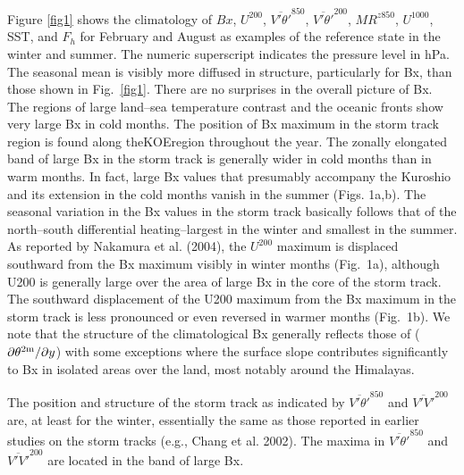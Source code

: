 \documentclass{ametsocV5}
\begin{document}
Figure \ref{fig1} shows the climatology of $Bx$, $U^{200}$,
$\overline{V'\theta'}^{850}$, $\overline{V'\theta'}^{200}$, 
$MR^{z850}$, $U^{1000}$, SST, and $F_h$ for February and
August as examples of the reference state in the winter
and summer. The numeric superscript indicates the pressure
level in hPa. The seasonal mean is visibly more
diffused in structure, particularly for Bx, than those
shown in Fig.~\ref{fig1}. There are no surprises in the overall
picture of Bx. The regions of large land--sea temperature
contrast and the oceanic fronts show very large Bx in cold
months. The position of Bx maximum in the storm track
region is found along theKOEregion throughout the year.
The zonally elongated band of large Bx in the storm track
is generally wider in cold months than in warm months.
In fact, large Bx values that presumably accompany the
Kuroshio and its extension in the cold months vanish in
the summer (Figs. 1a,b). The seasonal variation in the Bx
values in the storm track basically follows that of the
north--south differential heating--largest in the winter and
smallest in the summer. As reported by Nakamura et al.
(2004), the $U^{200}$ maximum is displaced southward from the
Bx maximum visibly in winter months (Fig.~1a), although
U200 is generally large over the area of large Bx in the core
of the storm track. The southward displacement of the
U200 maximum from the Bx maximum in the storm track
is less pronounced or even reversed in warmer months
(Fig.~1b). We note that the structure of the climatological
Bx generally reflects those of ($\partial{\theta^{2{\textrm m}}}/\partial{y}$) with some exceptions where
the surface slope contributes significantly to Bx
in isolated areas over the land, most notably around the
Himalayas.

The position and structure of the storm track as indicated
by $\overline{V'\theta'}^{850}$
and $\overline{V'V'}^{200}$
are, at least for the winter,
essentially the same as those reported in earlier studies on
the storm tracks (e.g., Chang et al. 2002). The maxima in
$\overline{V'\theta'}^{850}$
and $\overline{V'V'}^{200}$ are located in the band of large Bx.
\end{document}
